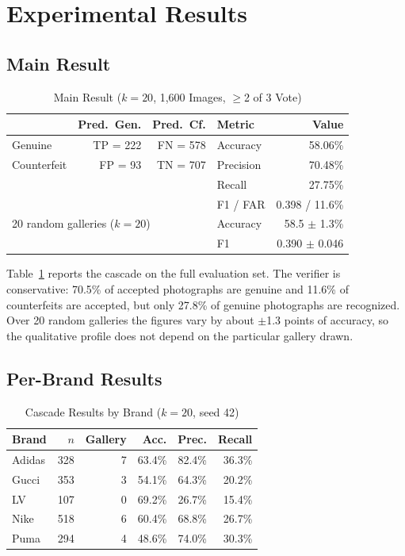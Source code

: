 \documentclass[conference]{IEEEtran}
\begin{document}
\section{Experimental Results}
\label{sec:results}

\subsection{Main Result}

\begin{table}[t]
\caption{Main Result ($k{=}20$, 1{,}600 Images, $\geq$2 of 3 Vote)}
\label{tab:metrics}
\centering
\begin{tabular}{lrr|lr}
\toprule
 & Pred.\ Gen. & Pred.\ Cf. & Metric & Value \\
\midrule
Genuine     & TP = 222 & FN = 578 & Accuracy  & 58.06\% \\
Counterfeit & FP = 93  & TN = 707 & Precision & 70.48\% \\
 & & & Recall & 27.75\% \\
 & & & F1 / FAR & 0.398 / 11.6\% \\
\midrule
\multicolumn{3}{l}{20 random galleries ($k{=}20$)} & Accuracy & 58.5 $\pm$ 1.3\% \\
 & & & F1 & 0.390 $\pm$ 0.046 \\
\bottomrule
\end{tabular}
\end{table}

Table~\ref{tab:metrics} reports the cascade on the full evaluation set.
The verifier is conservative: 70.5\% of accepted photographs are genuine
and 11.6\% of counterfeits are accepted, but only 27.8\% of genuine
photographs are recognized. Over 20 random galleries the figures vary by
about $\pm$1.3 points of accuracy, so the qualitative profile does not
depend on the particular gallery drawn.

\subsection{Per-Brand Results}
\label{sec:perbrand}

\begin{table}[t]
\caption{Cascade Results by Brand ($k{=}20$, seed 42)}
\label{tab:perbrand}
\centering
\begin{tabular}{lrrrrr}
\toprule
Brand & $n$ & Gallery & Acc. & Prec. & Recall \\
\midrule
Adidas & 328 & 7 & 63.4\% & 82.4\% & 36.3\% \\
Gucci  & 353 & 3 & 54.1\% & 64.3\% & 20.2\% \\
LV     & 107 & 0 & 69.2\% & 26.7\% & 15.4\% \\
Nike   & 518 & 6 & 60.4\% & 68.8\% & 26.7\% \\
Puma   & 294 & 4 & 48.6\% & 74.0\% & 30.3\% \\
\bottomrule
\end{tabular}
\end{table}
\end{document}
